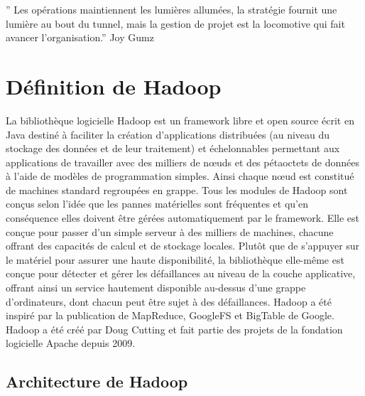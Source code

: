 \documentclass{report}
\begin{document}
\Large
\tableofcontents
\newpage
\listoffigures
\newpage

\Huge


\vspace*{\fill}
'' Les opérations maintiennent les lumières allumées, la stratégie fournit une lumière au bout du tunnel, mais la gestion de projet est la locomotive qui fait avancer l’organisation.''
\newline
\newline
 Joy Gumz
\vspace*{\fill}





\large
\newpage
\chapter{Définition de Hadoop }
La bibliothèque logicielle Hadoop est un framework libre et open source écrit en Java destiné à faciliter la création d'applications distribuées (au niveau du stockage des données et de leur traitement) et échelonnables permettant aux applications de travailler avec des milliers de nœuds et des pétaoctets de données à l'aide de modèles de programmation simples. Ainsi chaque nœud est constitué de machines standard regroupées en grappe. Tous les modules de Hadoop sont conçus selon l'idée que les pannes matérielles sont fréquentes et qu'en conséquence elles doivent être gérées automatiquement par le framework.
  Elle est conçue pour passer d'un simple serveur à des milliers de machines, chacune offrant des capacités de calcul et de stockage locales. Plutôt que de s'appuyer sur le matériel pour assurer une haute disponibilité, la bibliothèque elle-même est conçue pour détecter et gérer les défaillances au niveau de la couche applicative, offrant ainsi un service hautement disponible au-dessus d'une grappe d'ordinateurs, dont chacun peut être sujet à des défaillances.
Hadoop a été inspiré par la publication de MapReduce, GoogleFS et BigTable de Google. Hadoop a été créé par Doug Cutting et fait partie des projets de la fondation logicielle Apache depuis 2009.




\Large
\vspace*{\fill}
\section*{Architecture de Hadoop}
\end{document}
